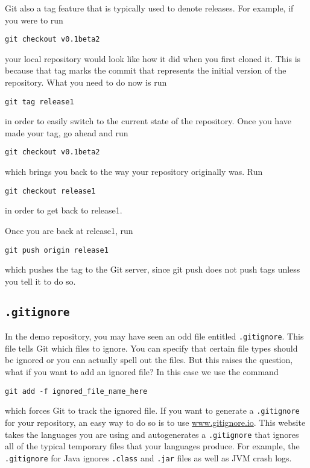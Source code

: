 \documentclass[notitlepage]{simple}
\begin{document}
Git also a tag feature that is typically used to denote releases.
For example, if you were to run
\begin{terminal}
	\verb|git checkout v0.1beta2|
\end{terminal}
your local repository would look like how it did when you first cloned it.
This is because that tag marks the commit that represents the initial version of the repository.
What you need to do now is run
\begin{terminal}
	\verb|git tag release1|
\end{terminal}
in order to easily switch to the current state of the repository.
Once you have made your tag, go ahead and run
\begin{terminal}
	\verb|git checkout v0.1beta2|
\end{terminal}
which brings you back to the way your repository originally was.
Run
\begin{terminal}
	\verb|git checkout release1|
\end{terminal}
in order to get back to release1.

Once you are back at release1, run
\begin{terminal}
	\verb|git push origin release1|
\end{terminal}
which pushes the tag to the Git server, since git push does not push tags unless you tell it to do so.

\subsection{\texttt{.gitignore}}

In the demo repository, you may have seen an odd file entitled \verb|.gitignore|.
This file tells Git which files to ignore.
You can specify that certain file types should be ignored or you can actually spell out the files.
But this raises the question, what if you want to add an ignored file?
In this case we use the command
\begin{terminal}
	\verb|git add -f ignored_file_name_here|
\end{terminal}
which forces Git to track the ignored file.
If you want to generate a \verb|.gitignore| for your repository, an easy way to do so is to use \url{www.gitignore.io}.
This website takes the languages you are using and autogenerates a \verb|.gitignore| that ignores all of the typical temporary files that your languages produce.
For example, the \verb|.gitignore| for Java ignores \verb|.class| and \verb|.jar| files as well as JVM crash logs.
\end{document}
